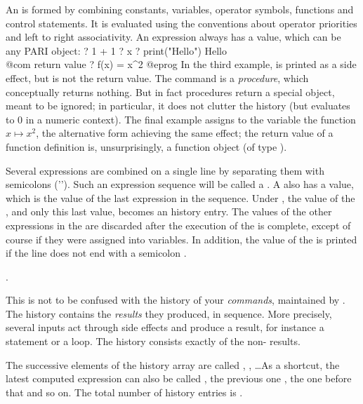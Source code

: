 An  is formed by combining
constants, variables, operator symbols, functions and control statements.
It is evaluated using the conventions about operator priorities and left to
right associativity. An expression always has a value, which can be any PARI
object:
\bprog
? 1 + 1
? x
? print("Hello")
Hello           \\@com {} return value
? f(x) = x^2
@eprog
\noindent In the third example,  is printed as a side effect, but
is not the return value. The  command is a \emph{procedure},
which conceptually returns nothing. But in fact procedures return a special
 object, meant to be ignored; in particular, it does not clutter
the history (but evaluates to $0$ in a numeric context). The final example
assigns to the variable  the function $x\mapsto x^2$, the alternative
form  achieving the same effect; the return value of a
function definition is, unsurprisingly, a function object (of type
).

Several expressions are combined on a single line by separating them with
semicolons ('\kbd{;}'). Such an expression sequence will be called a
. A  also has a value, which is the value of the last
expression in the sequence. Under , the value of the , and
only this last value, becomes an history entry. The values of the other
expressions in the  are discarded after the execution of the
 is complete, except of course if they were assigned into variables.
In addition, the value of the  is printed if the line does not end
with a semicolon \kbd{;}.

.

This is not to be confused with the history of your \emph{commands},
maintained by . The  history contains the \emph{results}
they produced, in sequence. More precisely, several inputs act through side
effects and produce a  result, for instance a  statement
or a  loop. The  history consists exactly of the
non- results.

The successive elements of the history array are called , ,
\dots As a shortcut, the latest computed expression can also be
called \kbd{\%}, the previous one ,
the one before that  and so on. The total number of history entries
is \kbd{\%\#}.

